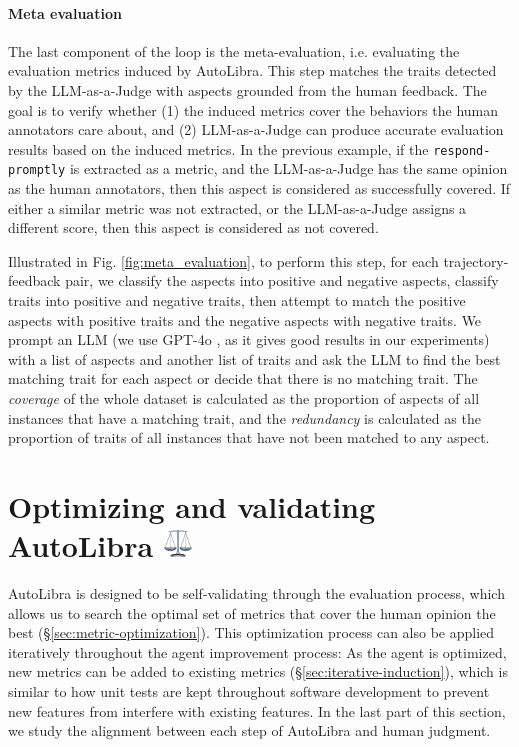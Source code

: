 \paragraph{Meta evaluation}
The last component of the loop is the meta-evaluation, i.e. evaluating the evaluation metrics induced by AutoLibra.
This step matches the traits detected by the LLM-as-a-Judge with aspects
grounded from the human feedback. The goal is to verify whether (1) the induced metrics cover the behaviors the human annotators care about, and (2) LLM-as-a-Judge can produce
accurate evaluation results based on the induced metrics. In the previous example,
if the \texttt{respond-promptly} is extracted as a metric, and the LLM-as-a-Judge
has the same opinion as the human annotators, then this aspect is considered as successfully covered.
If either a similar metric was not extracted, or the LLM-as-a-Judge assigns a different score,
then this aspect is considered as not covered.



Illustrated in Fig. \ref{fig:meta_evaluation}, to perform this step, for each trajectory-feedback pair, we classify the aspects into positive and negative aspects, classify
traits into positive and negative traits, then attempt to match the positive aspects with positive traits
and the negative aspects with negative traits. 
We prompt an LLM (we use GPT-4o \citep{openai2024gpt4ocard},
as it gives good results in our experiments) with a list of aspects and another list of traits
and ask the LLM to find the best matching trait for each aspect or decide that there is no matching trait.
The \emph{coverage} of the whole dataset is calculated as the  proportion of aspects of all instances that have a matching trait,
and the \emph{redundancy} is calculated as the proportion of traits of all instances that have not been matched to any aspect.

\section{Optimizing and validating AutoLibra \protect\includegraphics[height=1em]{figs/scale.png}}
AutoLibra is designed to be self-validating through the evaluation process, which allows us to search the optimal set of metrics that cover the human opinion the best (\S\ref{sec:metric-optimization}). 
This optimization process can also be applied iteratively throughout the agent improvement process: As the agent is optimized, new metrics can be added to existing metrics (\S\ref{sec:iterative-induction}), which is similar to how unit tests are kept throughout software development to prevent new features from interfere with existing features. 
In the last part of this section, we study the alignment between each step of AutoLibra and human judgment. 



